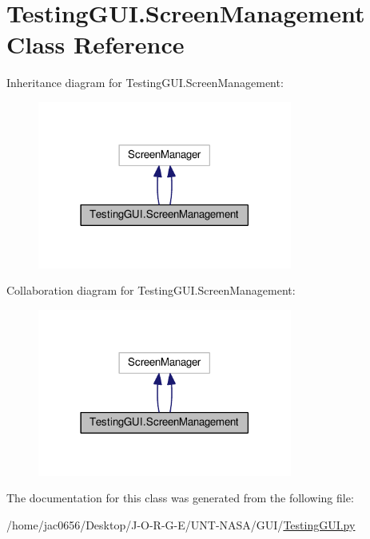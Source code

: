 \hypertarget{classTestingGUI_1_1ScreenManagement}{}\section{Testing\+G\+U\+I.\+Screen\+Management Class Reference}
\label{classTestingGUI_1_1ScreenManagement}


Inheritance diagram for Testing\+G\+U\+I.\+Screen\+Management\+:
\nopagebreak
\begin{figure}[H]
\begin{center}
\leavevmode
\includegraphics[width=237pt]{classTestingGUI_1_1ScreenManagement__inherit__graph}
\end{center}
\end{figure}


Collaboration diagram for Testing\+G\+U\+I.\+Screen\+Management\+:
\nopagebreak
\begin{figure}[H]
\begin{center}
\leavevmode
\includegraphics[width=237pt]{classTestingGUI_1_1ScreenManagement__coll__graph}
\end{center}
\end{figure}


The documentation for this class was generated from the following file\+:\begin{DoxyCompactItemize}
\item 
/home/jac0656/\+Desktop/\+J-\/\+O-\/\+R-\/\+G-\/\+E/\+U\+N\+T-\/\+N\+A\+S\+A/\+G\+U\+I/\hyperlink{GUI_2TestingGUI_8py}{Testing\+G\+U\+I.\+py}\end{DoxyCompactItemize}
